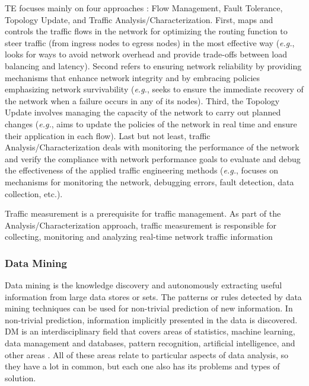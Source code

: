 TE focuses mainly on four approaches \cite{ian_2014:a_road_map_sdn}: Flow Management, Fault Tolerance, Topology Update, and Traffic Analysis/Characterization. First, maps and controls the traffic flows in the network for optimizing the routing function to steer traffic (from ingress nodes to egress nodes) in the most effective way (\textit{e.g.}, looks for ways to avoid network overhead and provide trade-offs between load balancing and latency). Second refers to ensuring network reliability by providing mechanisms that enhance network integrity and by embracing policies emphasizing network survivability (\textit{e.g.}, seeks to ensure the immediate recovery of the network when a failure occurs in any of its nodes). Third, the Topology Update involves managing the capacity of the network to carry out planned changes (\textit{e.g.}, aims to update the policies of the network in real time and ensure their application in each flow). Last but not least, traffic Analysis/Characterization deals with monitoring the performance of the network and verify the compliance with network performance goals to evaluate and debug the effectiveness of the applied traffic engineering methods (\textit{e.g.}, focuses on mechanisms for monitoring the network, debugging errors, fault detection, data collection, etc.).

Traffic measurement is a prerequisite for traffic management. As part of the Analysis/Characterization approach, traffic measurement is responsible for collecting, monitoring and analyzing real-time network traffic information



\subsubsection{Data Mining}
\label{subsub:background-dm}
Data mining is the knowledge discovery and autonomously extracting useful information from large data stores or sets. The patterns or rules detected by data mining techniques can be used for non-trivial prediction of new information. In non-trivial prediction, information implicitly presented in the data is discovered. DM is an interdisciplinary field that covers areas of statistics, machine learning, data management and databases, pattern recognition, artificial intelligence, and other areas \cite{Dua_2011:DM_ML_Cybersecurity, Dean_2014:BD_DM_ML}. All of these areas relate to particular aspects of data analysis, so they have a lot in common, but each one also has its problems and types of solution.

